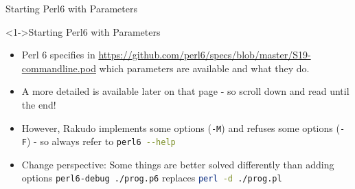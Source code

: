 \begin{frame}[fragile]{Starting Perl6 with Parameters}
\begin{block}<1->{Starting Perl6 with Parameters}
\begin{itemize}
\item<1-> Perl 6 specifies in \url{https://github.com/perl6/specs/blob/master/S19-commandline.pod}
which parameters are available and what they do.
\item<2-> A more detailed  is available later on that page - so scroll down and read until the end!
\item<3-> However, Rakudo implements some options (\texttt{-M}) and refuses some options (\texttt{-F}) - so always refer to \lstinline[language=sh,inputencoding=latin9]!perl6 --help!
\item<4-> Change perspective: Some things are better solved differently than adding options \lstinline[language=sh,inputencoding=latin9]!perl6-debug ./prog.p6! replaces \lstinline[language=sh,inputencoding=latin9]!perl -d ./prog.pl!
\end{itemize}
\end{block}
\end{frame}

